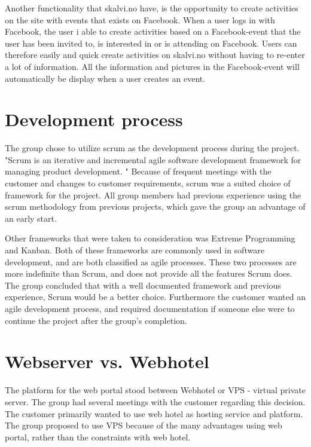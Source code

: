 Another functionality that skalvi.no have, is the opportunity to create activities on the site with events that exists on Facebook. When a user logs in with Facebook, the user i able to create activities based on a Facebook-event that the user has been invited to, is interested in or is attending on Facebook. Users can therefore easily and quick create activities on skalvi.no without having to re-enter a lot of information. All the information and pictures in the Facebook-event will automatically be display when a user creates an event.


\section{Development process} \label{s:development_process}
The group chose to utilize scrum \cite{scrum} as the development process during the project. "Scrum is an iterative and incremental agile software development framework for managing product development. \cite{scrumWikipedia}" Because of frequent meetings with the customer and changes to customer requirements, scrum was a suited choice of framework for the project. All group members had previous experience using the scrum methodology from previous projects, which gave the group an advantage of an early start. 

Other frameworks that were taken to consideration was Extreme Programming and Kanban. Both of these frameworks are commonly used in software development, and are both classified as agile processes. These two processes are more indefinite than Scrum, and does not provide all the features Scrum does. The group concluded that with a well documented framework and previous experience, Scrum would be a better choice. Furthermore the customer wanted an agile development process, and required documentation if someone else were to continue the project after the group's completion.


\section{Webserver vs. Webhotel}
The platform for the web portal stood between Webhotel or VPS - virtual private server.  The group had several meetings with the customer regarding this decision. The customer primarily wanted to use web hotel as hosting service and platform. The group proposed to use VPS because of the many advantages using web portal, rather than the constraints with web hotel. 

